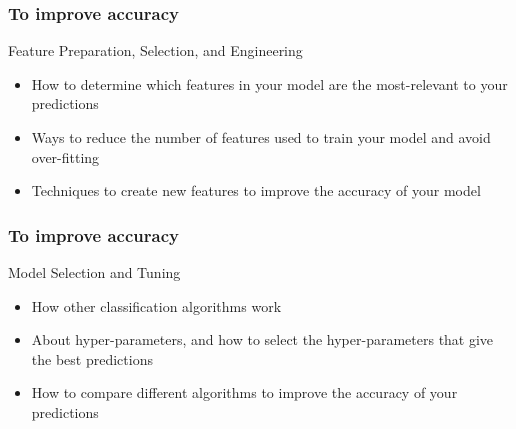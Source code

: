 \begin{frame}[fragile]\frametitle{To improve accuracy}
Feature Preparation, Selection, and Engineering
\begin{itemize}
\item How to determine which features in your model are the most-relevant to your predictions
\item Ways to reduce the number of features used to train your model and avoid over-fitting
\item Techniques to create new features to improve the accuracy of your model
\end{itemize}
\end{frame}

\begin{frame}[fragile]\frametitle{To improve accuracy}
Model Selection and Tuning 
\begin{itemize}
\item 
    How other classification algorithms work
\item About hyper-parameters, and how to select the hyper-parameters that give the best predictions
\item  How to compare different algorithms to improve the accuracy of your predictions
\end{itemize}
\end{frame}


